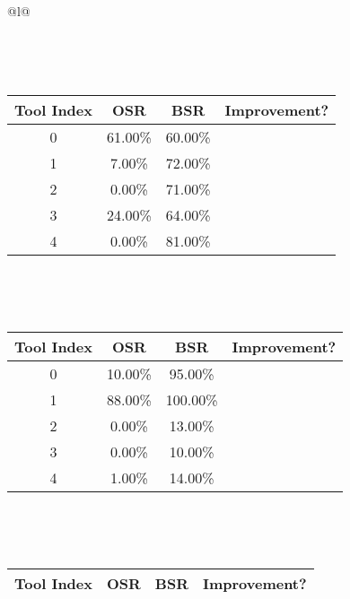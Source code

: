 \begin{longtable}{@{}l@{}}
\begin{minipage}{\textwidth}
\end{minipage}\\[2ex]
\begin{minipage}{\textwidth}
\centering\vspace{2ex}
\\[0.8ex]
\begin{tabular}{|c|c|c|c|} \hline
\textbf{Tool Index} & \textbf{OSR} & \textbf{ BSR} & \textbf{Improvement?} \\ \hline
0 & 61.00\% & 60.00\% & \textcolor{red}{\ding{55}} \\ \hline
1 & 7.00\% & 72.00\% & \textcolor{green}{\ding{51}} \\ \hline
2 & 0.00\% & 71.00\% & \textcolor{green}{\ding{51}} \\ \hline
3 & 24.00\% & 64.00\% & \textcolor{green}{\ding{51}} \\ \hline
4 & 0.00\% & 81.00\% & \textcolor{green}{\ding{51}} \\ \hline
\end{tabular}
\end{minipage}\\[2ex]
\begin{minipage}{\textwidth}
\centering\vspace{2ex}
\\[0.8ex]
\begin{tabular}{|c|c|c|c|} \hline
\textbf{Tool Index} & \textbf{OSR} & \textbf{ BSR} & \textbf{Improvement?} \\ \hline
0 & 10.00\% & 95.00\% & \textcolor{green}{\ding{51}} \\ \hline
1 & 88.00\% & 100.00\% & \textcolor{green}{\ding{51}} \\ \hline
2 & 0.00\% & 13.00\% & \textcolor{green}{\ding{51}} \\ \hline
3 & 0.00\% & 10.00\% & \textcolor{green}{\ding{51}} \\ \hline
4 & 1.00\% & 14.00\% & \textcolor{green}{\ding{51}} \\ \hline
\end{tabular}
\end{minipage}\\[2ex]
\begin{minipage}{\textwidth}
\centering\vspace{2ex}
\\[0.8ex]
\begin{tabular}{|c|c|c|c|} \hline
\textbf{Tool Index} & \textbf{OSR} & \textbf{ BSR} & \textbf{Improvement?} \\ \hline

\end{tabular}
\end{minipage}
\end{longtable}
